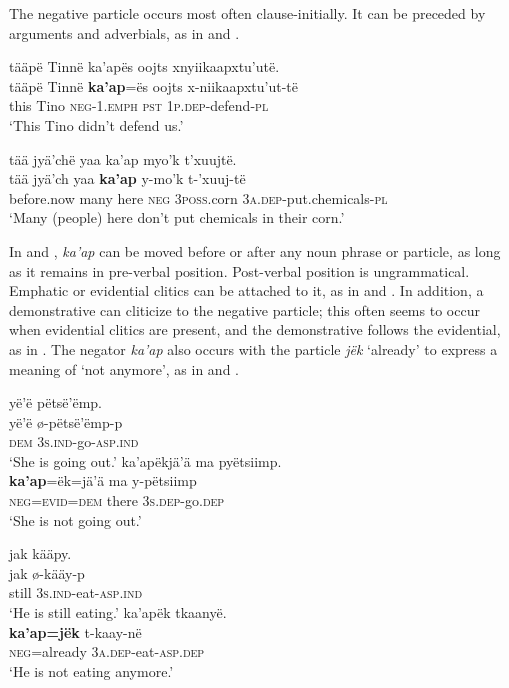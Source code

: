 \documentclass[output=paper,colorlinks,citecolor=brown,draft]{langscibook}
\begin{document}
The negative particle occurs most often clause-initially. It can be preceded by arguments and adverbials, as in  and . 

\ea\label{ex:mix:5}
    \glll  tääpë Tinnë ka’apës oojts xnyiikaapxtu’utë.\\
         tääpë Tinnë \textbf{ka’ap}=ës oojts x-niikaapxtu’ut-të\\
         this Tino \textsc{neg-1.emph} \textsc{pst} \textsc{1p.dep}-defend-\textsc{pl}\\
    \glt ‘This Tino didn’t defend us.’
\z

\ea\label{ex:mix:6}
    \glll tää jyä’chë yaa ka’ap myo’k t’xuujtë.\\
         tää jyä’ch yaa \textbf{ka’ap} y-mo’k t-’xuuj-të\\
         before.now many here \textsc{neg} \textsc{3poss}.corn \textsc{3a.dep}{}-put.chemicals-\textsc{pl} \\
    \glt ‘Many (people) here don’t put chemicals in their corn.’
\z

In  and , \textit{ka’ap} can be moved before or after any noun phrase or particle, as long as it remains in pre-verbal position. Post-verbal position is ungrammatical. Emphatic or evidential clitics can be attached to it, as in  and . In addition, a demonstrative can cliticize to the negative particle; this often seems to occur when evidential clitics are present, and the demonstrative follows the evidential, as in . The negator \textit{ka’ap} also occurs with the particle \textit{jëk} ‘already’ to express a meaning of ‘not anymore’, as in  and .

\ea\label{ex:mix:7}
    \ea\label{ex:mix:7a}
        \glll yë’ë pëtsë’ëmp. \\
             yë’ë ø-pëtsë’ëmp-p \\
             \textsc{dem} \textsc{3s.ind-}go-\textsc{asp.ind} \\
        \glt ‘She is going out.’
    \ex\label{ex:mix:7b}
        \glll ka’apëkjä’ä ma pyëtsiimp.\\ 
             \textbf{ka’ap}=ëk=jä’ä ma y-pëtsiimp \\
             \textsc{neg=evid=dem} there \textsc{3s.dep}{}-go.\textsc{dep} \\
        \glt ‘She is not going out.’
    \z
\z 

\ea\label{ex:mix:8}
    \ea\label{ex:mix:8a}
        \glll jak kääpy.\\
             jak ø-kääy-p \\
             still \textsc{3s.ind-}eat-\textsc{asp.ind} \\
        \glt ‘He is still eating.’
    \ex\label{ex:mix:8b}
        \glll ka’apëk tkaanyë.\\ 
             \textbf{ka’ap=jëk} t{}-kaay-në \\
             \textsc{neg=}already \textsc{3a.dep-}eat\textsc{{}-asp.dep} \\
        \glt ‘He is not eating anymore.’
    \z
\z 
 
\end{document}
